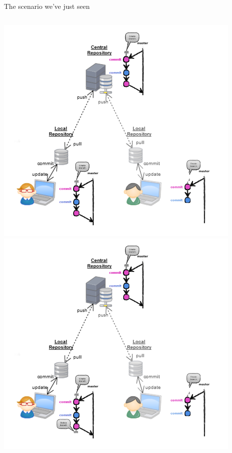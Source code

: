 \begin{frame}[fragile]{The scenario we've just seen}
\begin{columns}
\begin{column}{0.6\textwidth}
\begin{center}
{				\includegraphics[width=0.9\textwidth]{multiuser_remote_merge.png}
			}\only<7> {
				\includegraphics[width=0.9\textwidth]{multiuser_my_delete.png}
			}\only<8> {
}
\end{center}
\end{column}
\end{columns}
\end{frame}
